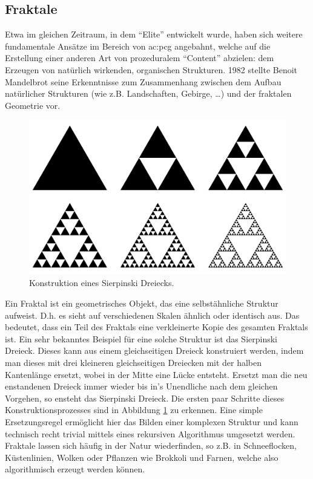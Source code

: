 \subsection{Fraktale}
Etwa im gleichen Zeitraum, in dem ``Elite'' entwickelt wurde, haben sich weitere fundamentale Ansätze im Bereich von \gls{ac:pcg} angebahnt,
welche auf die Erstellung einer anderen Art von prozeduralem ``Content'' abzielen: dem Erzeugen von natürlich wirkenden, organischen Strukturen.
1982 stellte Benoit Mandelbrot seine Erkenntnisse zum Zusammenhang zwischen dem Aufbau natürlicher Strukturen (wie z.B. Landschaften, Gebirge, \dots)
und der fraktalen Geometrie vor. \cite{19_mandelbrot}

\begin{figure}[t]
    \centering
    \includegraphics[width=(\imgWidth/2)]{images/sierpinski_triangle.pdf}
    \caption{Konstruktion eines Sierpinski Dreiecks.}
    \label{fig:sierpinski_triangle}
\end{figure}

Ein Fraktal ist ein geometrisches Objekt, das eine selbstähnliche Struktur aufweist. D.h. es sieht auf verschiedenen Skalen ähnlich oder identisch
aus. Das bedeutet, dass ein Teil des Fraktals eine verkleinerte Kopie des gesamten Fraktals ist. \cite{19_mandelbrot} Ein sehr bekanntes Beispiel
für eine solche Struktur ist das Sierpinski Dreieck. Dieses kann aus einem gleichseitigen Dreieck konstruiert werden,
indem man dieses mit drei kleineren gleichseitigen Dreiecken mit der halben Kantenlänge ersetzt, wobei in der Mitte eine Lücke entsteht. Ersetzt man
die neu enstandenen Dreieck immer wieder bis in's Unendliche nach dem gleichen Vorgehen, so ensteht das Sierpinski Dreieck. Die ersten paar Schritte
dieses Konstruktionsprozesses sind in Abbildung \ref{fig:sierpinski_triangle} zu erkennen. \cite{37_sierpinski} Eine simple Ersetzungsregel ermöglicht
hier das Bilden einer komplexen Struktur und kann technisch recht trivial mittels eines rekursiven Algorithmus umgesetzt werden. Fraktale lassen
sich häufig in der Natur wiederfinden, so z.B. in Schneeflocken, Küstenlinien, Wolken oder Pflanzen wie Brokkoli und Farnen, welche also algorithmisch
erzeugt werden können. \cite{19_mandelbrot}

